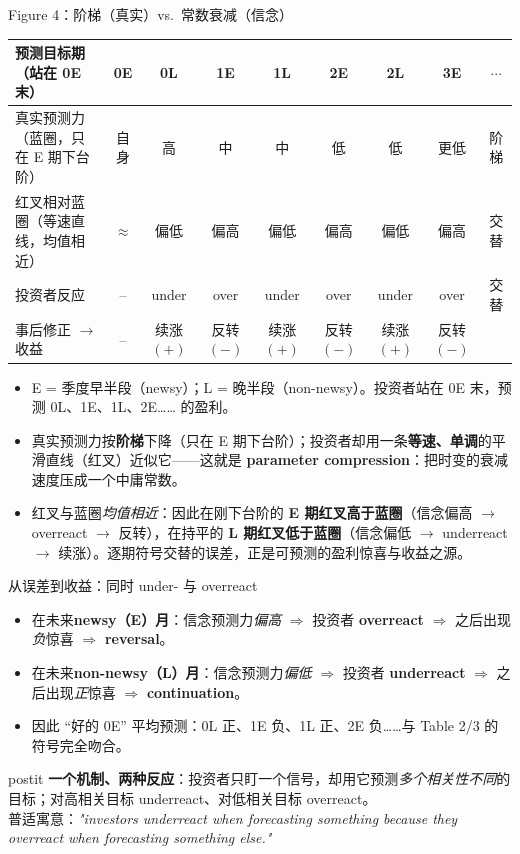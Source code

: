 \documentclass[aspectratio=169,10pt]{beamer}
\newcommand{\tighttable}{\scriptsize\setlength{\tabcolsep}{3pt}\renewcommand{\arraystretch}{1.12}}
\begin{document}
\begin{frame}{Figure 4：阶梯（真实）vs.\ 常数衰减（信念）}
	\tighttable
	\begin{tabularx}{\textwidth}{lcccccccc}
		\toprule
		预测目标期（站在 0E 末）& 0E & 0L & 1E & 1L & 2E & 2L & 3E & $\cdots$ \\
		\midrule
		真实预测力（蓝圈，只在 E 期下台阶）& 自身 & 高 & 中 & 中 & 低 & 低 & 更低 & 阶梯 \\
		红叉相对蓝圈（等速直线，均值相近）& $\approx$ & 偏低 & 偏高 & 偏低 & 偏高 & 偏低 & 偏高 & 交替 \\
		\midrule
		投资者反应 & -- & under & over & under & over & under & over & 交替 \\
		事后修正 $\to$ 收益 & -- & 续涨$(+)$ & 反转$(-)$ & 续涨$(+)$ & 反转$(-)$ & 续涨$(+)$ & 反转$(-)$ & \\
		\bottomrule
	\end{tabularx}
	\vspace{4pt}
	\begin{itemize}
		\item E = 季度早半段（newsy）；L = 晚半段（non-newsy）。投资者站在 0E 末，预测 0L、1E、1L、2E…… 的盈利。
		\item 真实预测力按\textbf{阶梯}下降（只在 E 期下台阶）；投资者却用一条\textbf{等速、单调}的平滑直线（红叉）近似它——这就是 \textbf{parameter compression}：把时变的衰减速度压成一个中庸常数。
		\item 红叉与蓝圈\emph{均值相近}：因此在刚下台阶的 \textbf{E 期红叉高于蓝圈}（信念偏高 $\to$ overreact $\to$ 反转），在持平的 \textbf{L 期红叉低于蓝圈}（信念偏低 $\to$ underreact $\to$ 续涨）。逐期符号交替的误差，正是可预测的盈利惊喜与收益之源。
	\end{itemize}
\end{frame}

\begin{frame}{从误差到收益：同时 under- 与 overreact}
	\begin{itemize}
		\item 在未来\textbf{newsy（E）月}：信念预测力\emph{偏高} $\Rightarrow$ 投资者 \textbf{overreact} $\Rightarrow$ 之后出现\emph{负}惊喜 $\Rightarrow$ \textbf{reversal}。
		\item 在未来\textbf{non-newsy（L）月}：信念预测力\emph{偏低} $\Rightarrow$ 投资者 \textbf{underreact} $\Rightarrow$ 之后出现\emph{正}惊喜 $\Rightarrow$ \textbf{continuation}。
		\item 因此 ``好的 0E'' 平均预测：0L 正、1E 负、1L 正、2E 负……与 Table 2/3 的符号完全吻合。
	\end{itemize}
	\vspace{3pt}
	\begin{beamercolorbox}[sep=0.5em,wd=\linewidth,rounded=true]{postit}
		\textbf{一个机制、两种反应}：投资者只盯一个信号，却用它预测\emph{多个相关性不同}的目标；对高相关目标 underreact、对低相关目标 overreact。\\
		普适寓意：\textit{"investors underreact when forecasting something because they overreact when forecasting something else."}
	\end{beamercolorbox}
\end{frame}
\end{document}

